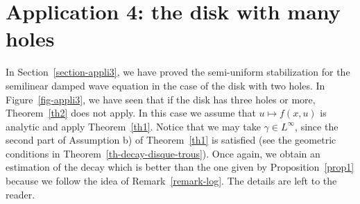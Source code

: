 \documentclass[10pt]{amsart}
\theoremstyle{definition}\newtheorem{defi}[theo]{Definition}\newtheorem{rema}[theo]{Remark}\newtheorem{exam}[theo]{Example}\newtheorem{exem}[theo]{Example}\newtheorem{nota}[theo]{Notation}
\begin{document}
\section{Application 4: the disk with many holes}\label{section-appli4}

In Section~\ref{section-appli3}, we have proved the semi-uniform stabilization for the semilinear damped wave equation in the case of the disk with two holes. In Figure~\ref{fig-appli3}, we have seen that if the disk has three holes or more, Theorem~\ref{th2} does not apply. In this case we assume that $u\mapsto f(x,u)$ is analytic and apply Theorem~\ref{th1}. Notice that we may take $\gamma\in L^\infty$, since the second part of Assumption b) of Theorem~\ref{th1} is satisfied (see the geometric conditions in Theorem~\ref{th-decay-disque-trous}). Once again, we obtain an estimation of the decay which is better than the one given by Proposition~\ref{prop1} because we follow the idea of Remark~\ref{remark-log}. The details are left to the reader.
\end{document}
